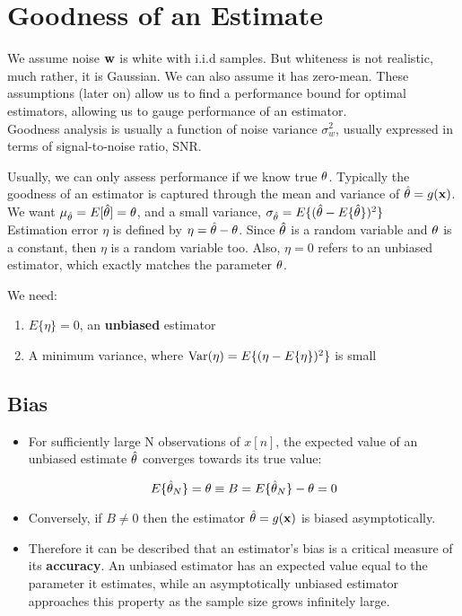 \section{Goodness of an Estimate}

We assume noise $\mathbf{w}$ is white with i.i.d samples. But whiteness is not realistic, much rather, it is Gaussian. We can also assume it has zero-mean. These assumptions (later on) allow us to find a performance bound for optimal estimators, allowing us to gauge performance of an estimator.\\

Goodness analysis is usually a function of noise variance $\sigma_w^2$, usually expressed in terms of signal-to-noise ratio, SNR.

Usually, we can only assess performance if we know true $\theta$. Typically the goodness of an estimator is captured through the mean and variance of $\hat{\theta} = g(\mathbf{x})$. \\

We want $\mu_{\hat{\theta}} = E[\hat{\theta}] = \theta$, and a small variance, $\sigma_{\hat{\theta}} = E\{(\hat{\theta} - E \{\hat{\theta}\})^2\}$\\

Estimation error $\eta$ is defined by $\eta = \hat{\theta} - \theta$. Since $\hat{\theta}$ is a random variable and $\theta$ is a constant, then $\eta$ is a random variable too. Also, $\eta =0$ refers to an unbiased estimator, which exactly matches the parameter $\theta$.

We need:
\begin{enumerate}
    \item $E\{\eta\} = 0$, an \textbf{unbiased} estimator
    \item A minimum variance, where $\text{Var}(\eta)=E\{(\eta-E\{\eta\})^2\}$ is small
\end{enumerate}

\subsection{Bias}

\begin{itemize}
\item For sufficiently large N observations of $x[n]$, the expected value of an unbiased estimate $\hat{\theta}$ converges towards its true value:

\begin{equation}
    E\{\hat{\theta}_N\} = \theta \equiv B =  E\{\hat{\theta}_N\}- \theta =0
\end{equation}

\item Conversely, if $B\neq 0$ then the estimator $\hat{\theta} = g(\mathbf{x})$ is biased asymptotically.
\item Therefore it can be described that an estimator's bias is a critical measure of its \textbf{accuracy}. An unbiased estimator has an expected value equal to the parameter it estimates, while an asymptotically unbiased estimator approaches this property as the sample size grows infinitely large.
\end{itemize}

